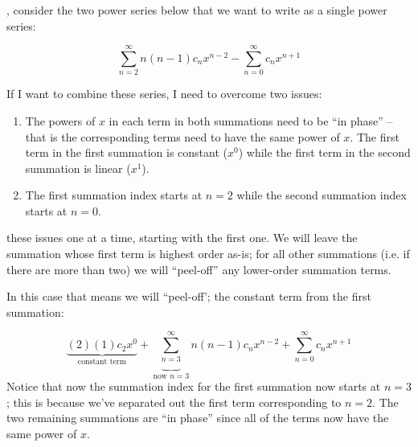 , consider the two power series below that we want to write as a single power series:

\begin{equation*}
\sum\limits_{n=2}^{\infty} n(n-1)c_n x^{n-2} - \sum\limits_{n=0}^{\infty} c_n x^{n+1}
\end{equation*}

\noindent If I want to combine these series, I need to overcome two issues:
\begin{enumerate}

\item The powers of $x$ in each term in both summations need to be ``in phase'' -- that is the corresponding terms need to have the same power of $x$.  The first term in the first summation is constant ($x^0$) while the first term in the second summation is linear ($x^1$). 


\item The first summation index starts at $n=2$ while the second summation index starts at $n=0$.

\end{enumerate}


 these issues one at a time, starting with the first one.  We will leave the summation whose first term is highest order as-is; for all other summations (i.e. if there are more than two) we will ``peel-off'' any lower-order summation terms.

In this case that means we will ``peel-off'; the constant term from the first summation:

$$\underbrace{(2)(1)c_2x^0}_{\text{constant term}} + \underbrace{\sum\limits_{n=3}^{\infty}}_{\text{now }n=3} n(n-1)c_nx^{n-2} + \sum\limits_{n=0}^{\infty}c_nx^{n+1}$$
Notice that now the summation index for the first summation now starts at $n=3$; this is because we've separated out the first term corresponding to $n=2$.  The two remaining summations are ``in phase'' since all of the terms now have the same power of $x$.

